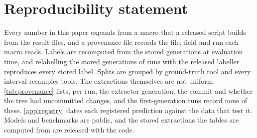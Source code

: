 \documentclass{article}
\theoremstyle{plain}
\theoremstyle{remark}
\theoremstyle{definition}
\begin{document}
\section*{Reproducibility statement}
Every number in this paper expands from a macro that a released script builds from the result files, and a provenance file records the file, field and run each macro reads. Labels are recomputed from the stored generations at evaluation time, and relabelling the stored generations of \nRelabelRuns{} runs with the released labeller reproduces every stored label. Splits are grouped by ground-truth tool and every interval resamples tools. The extractions themselves are not uniform: \cref{tab:provenance} lists, per run, the extractor generation, the commit and whether the tree had uncommitted changes, and the first-generation runs record none of these. \cref{app:registry} dates each registered prediction against the data that test it. Models and benchmarks are public, and the stored extractions the tables are computed from are released with the code.




\appendix
\onecolumn
\makeatletter
\def\addcontentsline#1#2#3{\addtocontents{#1}{\protect\contentsline{#2}{#3}{\thepage}{}}}
\makeatother

\end{document}
